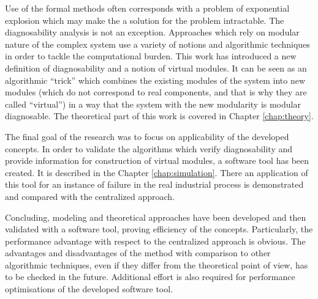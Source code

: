 Use of the formal methods often corresponds with a problem of exponential
explosion which may make the a solution for the problem intractable. The
diagnosability analysis is not an exception. Approaches which rely on modular
nature of the complex system use a variety of notions and algorithmic techniques
in order to tackle the computational burden. This work has introduced a new
definition of diagnosability and a notion of virtual modules. It can be seen
as an algorithmic ``trick'' which combines the existing modules of the system
into new modules (which do not correspond to real components, and that
is why they are called ``virtual'') in a way that the system with the new
modularity is modular diagnosable. The theoretical part of this work is covered
in Chapter \ref{chap:theory}.

The final goal of the research was to focus on applicability of the developed
concepts. In order to validate the algorithms which verify diagnosability and
provide information for construction of virtual modules, a software tool has
been created. It is described in the Chapter \ref{chap:simulation}. There an
application of this tool for an instance of failure in the real
industrial process is demonstrated and compared with the centralized approach.

Concluding, modeling and theoretical approaches have been developed and then 
validated with a software tool, proving efficiency of the concepts.
Particularly, the performance advantage with respect to the centralized approach
is obvious. The advantages and disadvantages of the method with comparison to
other algorithmic techniques, even if they differ from the theoretical point of
view, has to be checked in the future.
Additional effort is also required for performance optimisations of the
developed software tool.
